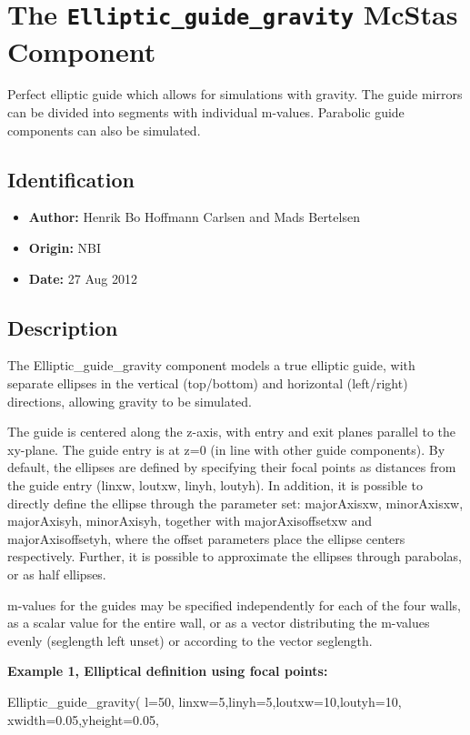 \section{The \texttt{Elliptic\_guide\_gravity} McStas Component}
Perfect elliptic guide which allows for simulations with gravity.
The guide mirrors can be divided into segments with individual m-values.
Parabolic guide components can also be simulated.

\subsection*{Identification}
\begin{itemize}
  \item \textbf{Author:} Henrik Bo Hoffmann Carlsen and Mads Bertelsen
  \item \textbf{Origin:} NBI
  \item \textbf{Date:} 27 Aug 2012
\end{itemize}

\subsection*{Description}
The Elliptic\_guide\_gravity component models a true elliptic guide, with separate ellipses in the vertical (top/bottom) and horizontal (left/right) directions, allowing gravity to be simulated.

The guide is centered along the z-axis, with entry and exit planes parallel to the xy-plane. The guide entry is at z=0 (in line with other guide components). By default, the ellipses are defined by specifying their focal points as distances from the guide entry (linxw, loutxw, linyh, loutyh). In addition, it is possible to directly define the ellipse through the parameter set: majorAxisxw, minorAxisxw, majorAxisyh, minorAxisyh, together with majorAxisoffsetxw and majorAxisoffsetyh, where the offset parameters place the ellipse centers respectively. Further, it is possible to approximate the ellipses through parabolas, or as half ellipses.

m-values for the guides may be specified independently for each of the four walls, as a scalar value for the entire wall, or as a vector distributing the m-values evenly (seglength left unset) or according to the vector seglength.

\textbf{Example 1, Elliptical definition using focal points:}

Elliptic\_guide\_gravity( l=50, linxw=5,linyh=5,loutxw=10,loutyh=10, xwidth=0.05,yheight=0.05,

